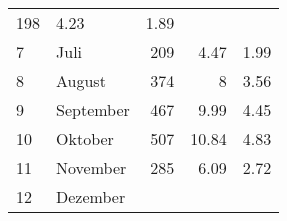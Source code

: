 \begin{longtable}{lXrrr}
       \num{198} &
       \num[round-mode=places,round-precision=2]{4.23} &
         \num[round-mode=places,round-precision=2]{1.89} \\

     7 &
     \multicolumn{1}{X}{ Juli   } &


       \num{209} &
       \num[round-mode=places,round-precision=2]{4.47} &
         \num[round-mode=places,round-precision=2]{1.99} \\

     8 &
     \multicolumn{1}{X}{ August   } &


       \num{374} &
       \num[round-mode=places,round-precision=2]{8} &
         \num[round-mode=places,round-precision=2]{3.56} \\

     9 &
     \multicolumn{1}{X}{ September   } &


       \num{467} &
       \num[round-mode=places,round-precision=2]{9.99} &
         \num[round-mode=places,round-precision=2]{4.45} \\

     10 &
     \multicolumn{1}{X}{ Oktober   } &


       \num{507} &
       \num[round-mode=places,round-precision=2]{10.84} &
         \num[round-mode=places,round-precision=2]{4.83} \\

     11 &
     \multicolumn{1}{X}{ November   } &


       \num{285} &
       \num[round-mode=places,round-precision=2]{6.09} &
         \num[round-mode=places,round-precision=2]{2.72} \\

     12 &
     \multicolumn{1}{X}{ Dezember   } &



\end{longtable}
